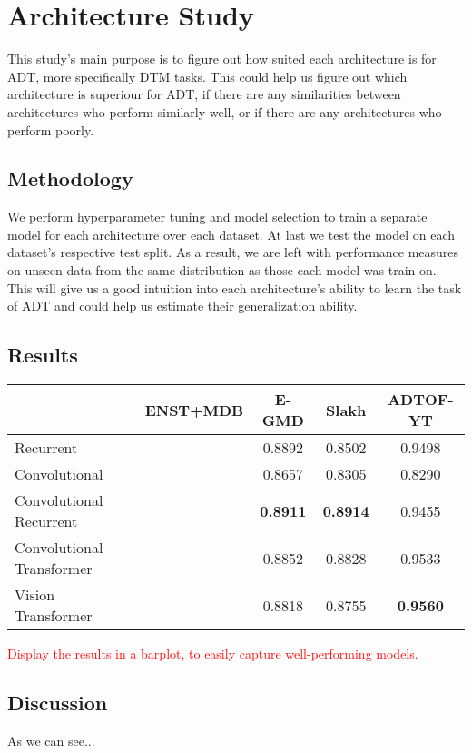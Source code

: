 \chapter{Architecture Study}

This study's main purpose is to figure out how suited each architecture is for \gls{ADT}, more specifically \gls{DTM} tasks. This could help us figure out which architecture is superiour for \gls{ADT}, if there are any similarities between architectures who perform similarly well, or if there are any architectures who perform poorly.

\section{Methodology}

We perform hyperparameter tuning and model selection to train a separate model for each architecture over each dataset. At last we test the model on each dataset's respective test split. As a result, we are left with performance measures on unseen data from the same distribution as those each model was train on. This will give us a good intuition into each architecture's ability to learn the task of \gls{ADT} and could help us estimate their generalization ability.

\section{Results}

\begin{center}
    \begin{tabular}{|l|c|c|c|c|}
    \hline
                   & ENST+MDB & E-GMD & Slakh & ADTOF-YT \\
    \hline
    Recurrent &       & 0.8892          & 0.8502          & 0.9498          \\
    Convolutional &       & 0.8657          & 0.8305          & 0.8290          \\
    Convolutional Recurrent &       & \textbf{0.8911}          & \textbf{0.8914}          & 0.9455          \\
    Convolutional Transformer &        & 0.8852          & 0.8828          & 0.9533          \\
    Vision Transformer &       & 0.8818          & 0.8755          & \textbf{0.9560}         \\   
    \hline

    \end{tabular}
\end{center}		

\textcolor{red}{Display the results in a barplot, to easily capture well-performing models.}

\section{Discussion}

As we can see...